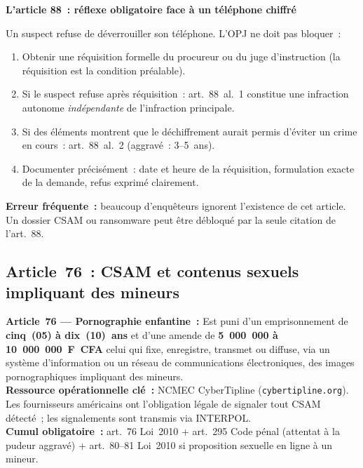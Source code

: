 \begin{boxPNC}
\textbf{L'article 88~: réflexe obligatoire face à un téléphone chiffré}

Un suspect refuse de déverrouiller son téléphone. L'OPJ ne doit pas bloquer~:
\begin{enumerate}
    \item Obtenir une réquisition formelle du procureur ou du juge
          d'instruction (la réquisition est la condition préalable).
    \item Si le suspect refuse après réquisition~: art.~88~al.~1
          constitue une infraction autonome \emph{indépendante} de
          l'infraction principale.
    \item Si des éléments montrent que le déchiffrement aurait permis
          d'éviter un crime en cours~: art.~88~al.~2 (aggravé~: 3--5~ans).
    \item Documenter précisément~: date et heure de la réquisition,
          formulation exacte de la demande, refus exprimé clairement.
\end{enumerate}
\textbf{Erreur fréquente~:} beaucoup d'enquêteurs ignorent l'existence
de cet article. Un dossier CSAM ou ransomware peut être débloqué par
la seule citation de l'art.~88.
\end{boxPNC}

\subsection{Article~76~: CSAM et contenus sexuels impliquant des mineurs}

\begin{boxjuris}
\textbf{Article~76 --- Pornographie enfantine~:}
Est puni d'un emprisonnement de \textbf{cinq~(05) à dix~(10)~ans} et
d'une amende de \textbf{5~000~000 à 10~000~000~F~CFA} celui qui fixe,
enregistre, transmet ou diffuse, via un système d'information ou un
réseau de communications électroniques, des images pornographiques
impliquant des mineurs.\\[0.3ex]
\textbf{Ressource opérationnelle clé~:} NCMEC CyberTipline
(\texttt{cybertipline.org}). Les fournisseurs américains ont l'obligation
légale de signaler tout CSAM détecté~; les signalements sont transmis
via INTERPOL.\\[0.3ex]
\textbf{Cumul obligatoire~:} art.~76 Loi~2010 + art.~295 Code pénal
(attentat à la pudeur aggravé) + art.~80--81 Loi~2010 si proposition
sexuelle en ligne à un mineur.
\end{boxjuris}

